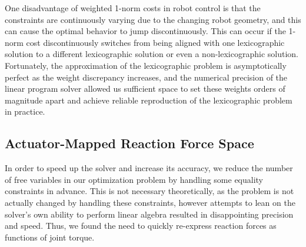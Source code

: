 One disadvantage of weighted 1-norm costs in robot control is that the constraints are continuously varying due to the changing robot geometry, and this can cause the optimal behavior to jump discontinuously.
This can occur if the 1-norm cost discontinuously switches from being aligned with one lexicographic solution to a different lexicographic solution or even a non-lexicographic solution.
Fortunately, the approximation of the lexicographic problem is asymptotically perfect as the weight discrepancy increases, and the numerical precision of the linear program solver allowed us sufficient space to set these weights orders of magnitude apart and achieve reliable reproduction of the lexicographic problem in practice.


\subsection{Actuator-Mapped Reaction Force Space}\label{sec:actuator_mapped}
In order to speed up the solver and increase its accuracy, we reduce the number of free variables in our optimization problem by handling some equality constraints in advance. This is not necessary theoretically, as the problem is not actually changed by handling these constraints, however attempts to lean on the solver's own ability to perform linear algebra resulted in disappointing precision and speed. Thus, we found the need to quickly re-express reaction forces as functions of joint torque.

